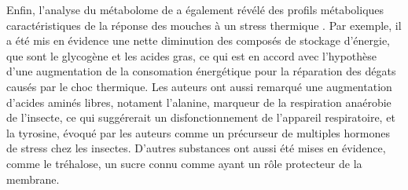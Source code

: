 		Enfin, l'analyse du métabolome de  a également révélé des profils métaboliques caractéristiques de la réponse des mouches à un stress thermique \cite{malmendal2006}.
		Par exemple, il a été mis en évidence une nette diminution des composés de stockage d'énergie, que sont le glycogène et les acides gras, ce qui est en accord avec l'hypothèse d'une augmentation de la consomation énergétique pour la réparation des dégats causés par le choc thermique.
		Les auteurs ont aussi remarqué une augmentation d'acides aminés libres, notament l'alanine, marqueur de la respiration anaérobie de l'insecte, ce qui suggérerait un disfonctionnement de l'appareil respiratoire, et la tyrosine, évoqué par les auteurs comme un précurseur de multiples hormones de stress chez les insectes.
		D'autres substances ont aussi été mises en évidence, comme le tréhalose, un sucre connu comme ayant un rôle protecteur de la membrane.
		

